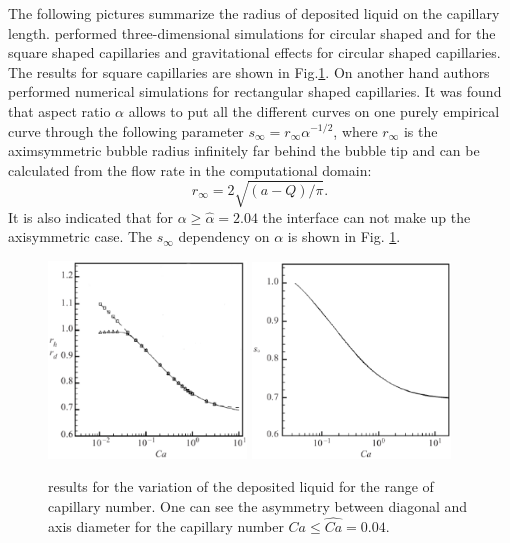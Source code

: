 \documentclass{article}
\begin{document}
The following pictures summarize the radius of deposited liquid on the capillary length.
\citet{heil-threedim} performed three-dimensional simulations for circular shaped and for the
square shaped capillaries and gravitational effects for circular shaped capillaries. The results for
square capillaries are shown in Fig.\ref{fig:heil:three:dim}. On another hand authors performed
numerical simulations for rectangular shaped capillaries. It was found that aspect ratio $\alpha$
allows to put all the different curves on one purely empirical curve through the following parameter
$s_{\infty}=r_{\infty} \alpha^{-1/2}$, where $r_{\infty}$ is the aximsymmetric bubble radius
infinitely far behind the bubble tip and can be calculated from the flow rate in the computational
domain:
\begin{equation}
r_{\infty}=2\sqrt{(a-Q)/\pi}.
\end{equation}
It is also indicated that for $\alpha\geq\hat{\alpha}=2.04$ the interface can not make up the
axisymmetric case. The $s_{\infty}$ dependency on $\alpha$ is shown in Fig.
\ref{fig:heil:three:dim}.
\begin{figure}
\includegraphics[width=0.47\textwidth]{Figures/capillary_width_heil.eps}\hfill
\includegraphics[width=0.47\textwidth]{Figures/capillary_rectangular_width_heil.eps}\\
\caption{\citet{heil-threedim} results for the variation of the deposited liquid for the range of
capillary number. One can see the asymmetry between diagonal and axis diameter for the capillary
number $Ca\leq\hat{Ca}=0.04$.\label{fig:heil:three:dim}}
\end{figure}
\end{document}
